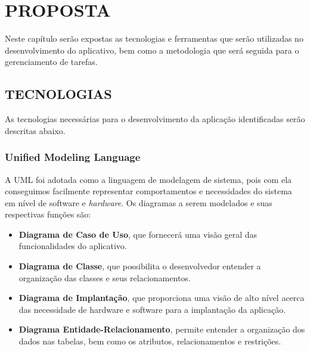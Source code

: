 
\chapter{PROPOSTA}
\label{chap:proposta}

Neste capítulo serão expostas as tecnologias e ferramentas que serão utilizadas no desenvolvimento do aplicativo, bem como a metodologia que será seguida para o gerenciamento de tarefas.

\section{TECNOLOGIAS}
\label{sec:tecnologias}


As tecnologias necessárias para o desenvolvimento da aplicação identificadas serão descritas abaixo.

\subsection{Unified Modeling Language}
\label{sub:uml}

A UML foi adotada como a linguagem de modelagem de sistema, pois com ela conseguimos facilmente representar comportamentos e necessidades do sistema em nível de software e \textit{hardware}. Os diagramas a serem modelados e suas respectivas funções são:

\begin{itemize}
    \item \textbf{Diagrama de Caso de Uso}, que fornecerá uma visão geral das funcionalidades do aplicativo.
    
    \item \textbf{Diagrama de Classe}, que possibilita o desenvolvedor entender a organização das classes e seus relacionamentos.
    
    \item \textbf{Diagrama de Implantação}, que proporciona uma visão de alto nível acerca das necessidade de hardware e software para a implantação da aplicação.
    
    \item \textbf{Diagrama Entidade-Relacionamento}, permite entender a organização dos dados nas tabelas, bem como os atributos, relacionamentos e restrições.
\end{itemize}

